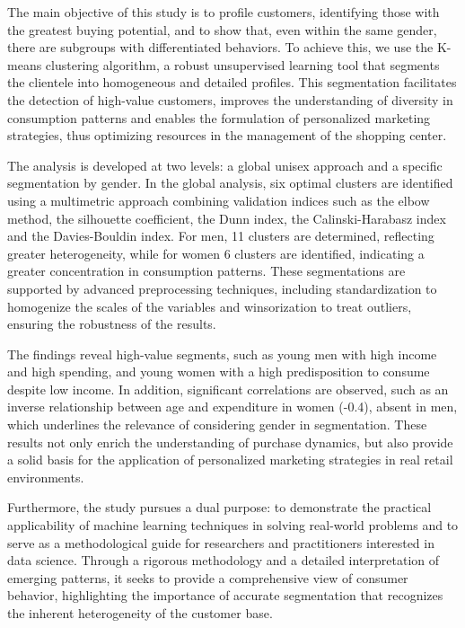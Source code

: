 \documentclass[10pt]{article}
\begin{document}
The main objective of this study is to profile customers, identifying those with the greatest buying potential, and to show that, even within the same gender, there are subgroups with differentiated behaviors. To achieve this, we use the K-means clustering algorithm, a robust unsupervised learning tool that segments the clientele into homogeneous and detailed profiles. This segmentation facilitates the detection of high-value customers, improves the understanding of diversity in consumption patterns and enables the formulation of personalized marketing strategies, thus optimizing resources in the management of the shopping center.

The analysis is developed at two levels: a global unisex approach and a specific segmentation by gender. In the global analysis, six optimal clusters are identified using a multimetric approach combining validation indices such as the elbow method, the silhouette coefficient, the Dunn index, the Calinski-Harabasz index and the Davies-Bouldin index. For men, 11 clusters are determined, reflecting greater heterogeneity, while for women 6 clusters are identified, indicating a greater concentration in consumption patterns. These segmentations are supported by advanced preprocessing techniques, including standardization to homogenize the scales of the variables and winsorization to treat outliers, ensuring the robustness of the results.

The findings reveal high-value segments, such as young men with high income and high spending, and young women with a high predisposition to consume despite low income. In addition, significant correlations are observed, such as an inverse relationship between age and expenditure in women (-0.4), absent in men, which underlines the relevance of considering gender in segmentation. These results not only enrich the understanding of purchase dynamics, but also provide a solid basis for the application of personalized marketing strategies in real retail environments.

Furthermore, the study pursues a dual purpose: to demonstrate the practical applicability of machine learning techniques in solving real-world problems and to serve as a methodological guide for researchers and practitioners interested in data science. Through a rigorous methodology and a detailed interpretation of emerging patterns, it seeks to provide a comprehensive view of consumer behavior, highlighting the importance of accurate segmentation that recognizes the inherent heterogeneity of the customer base.
\end{document}
